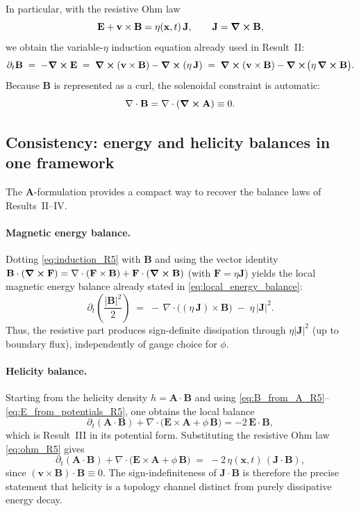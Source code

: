 \documentclass[11pt]{article}
\theoremstyle{plain}
\theoremstyle{definition}
\theoremstyle{remark}
\newcommand{\diver}{\nabla\cdot}
\newcommand{\A}{\mathbf{A}}
\newcommand{\B}{\mathbf{B}}
\newcommand{\E}{\mathbf{E}}
\newcommand{\J}{\mathbf{J}}
\newcommand{\vfield}{\mathbf{v}}
\begin{document}
In particular, with the resistive Ohm law
\begin{equation}\label{eq:ohm_R5}
  \E + \vfield\times\B = \eta(\mathbf{x},t)\,\J,
  \qquad \J=\curl\B,
\end{equation}
we obtain the variable-$\eta$ induction equation already used in Result~II:
\begin{equation}\label{eq:induction_R5}
  \partial_t\B
  \;=\;
  -\curl\E
  \;=\;
  \curl(\vfield\times\B) - \curl(\eta\,\J)
  \;=\;
  \curl(\vfield\times\B) - \curl\!\big(\eta\,\curl\B\big).
\end{equation}
Because $\B$ is represented as a curl, the solenoidal constraint is automatic:
\begin{equation}\label{eq:divB_auto}
  \diver\B = \diver(\curl\A) \equiv 0.
\end{equation}

\subsection{Consistency: energy and helicity balances in one framework}\label{sec:result_Aform_balances}
The $\A$-formulation provides a compact way to recover the balance laws of Results~II--IV.

\paragraph{Magnetic energy balance.}
Dotting \eqref{eq:induction_R5} with $\B$ and using the vector identity
$\B\cdot(\curl \mathbf{F})=\diver(\mathbf{F}\times\B)+\mathbf{F}\cdot(\curl\B)$
(with $\mathbf{F}=\eta\J$) yields the local magnetic energy balance already stated in
\eqref{eq:local_energy_balance}:
\begin{equation}\label{eq:energy_balance_R5}
  \partial_t\!\left(\frac{|\B|^2}{2}\right)
  \;=\;
  -\,\diver\!\big((\eta\,\J)\times\B\big) \;-\; \eta\,|\J|^2.
\end{equation}
Thus, the resistive part produces sign-definite dissipation through $\eta|\J|^2$ (up to boundary flux),
independently of gauge choice for $\phi$.

\paragraph{Helicity balance.}
Starting from the helicity density $h=\A\cdot\B$ and using \eqref{eq:B_from_A_R5}--\eqref{eq:E_from_potentials_R5},
one obtains the local balance
\begin{equation}\label{eq:helicity_balance_R5}
  \partial_t(\A\cdot\B) + \diver\!\big(\E\times\A + \phi\,\B\big) = -2\,\E\cdot\B,
\end{equation}
which is Result~III in its potential form. Substituting the resistive Ohm law \eqref{eq:ohm_R5} gives
\begin{equation}\label{eq:helicity_balance_eta_R5}
  \partial_t(\A\cdot\B) + \diver\!\big(\E\times\A + \phi\,\B\big)
  \;=\;
  -2\,\eta(\mathbf{x},t)\,(\J\cdot\B),
\end{equation}
since $(\vfield\times\B)\cdot\B\equiv 0$. The sign-indefiniteness of $\J\cdot\B$ is therefore the
precise statement that helicity is a topology channel distinct from purely dissipative energy decay.
\end{document}
